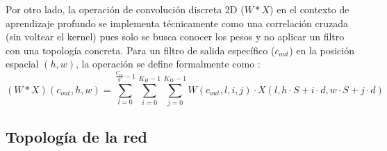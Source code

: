 \documentclass{article}
\begin{document}
	Por otro lado, la operación de convolución discreta 2D ($W*X$) en el contexto de aprendizaje profundo se implementa técnicamente como una correlación cruzada (sin voltear el kernel) pues solo se busca conocer los pesos y no aplicar un filtro con una topología concreta. Para un filtro de salida específico ($c_{out}$) en la posición espacial $(h, w)$, la operación se define formalmente como \cite{conv}:	
	\begin{equation}
		(W * X)(c_{out}, h, w) = \sum_{l=0}^{\frac{C_{in}}{g}-1} \sum_{i=0}^{K_H-1} \sum_{j=0}^{K_W-1} W(c_{out}, l, i, j) \cdot X(l, h \cdot S + i \cdot d , w \cdot S + j \cdot d)
	\end{equation}
	\newpage
	\subsection{Topología de la red}
	
\end{document}
